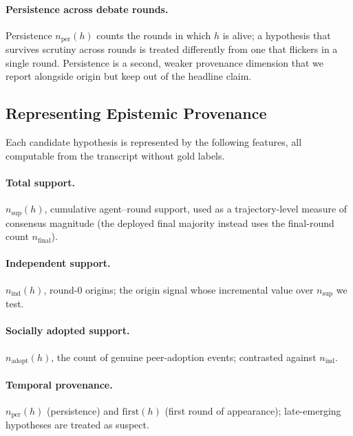 \paragraph{Persistence across debate rounds.}
\label{par:persistence}
Persistence $n_{\mathrm{per}}(h)$ counts the rounds in which $h$ is alive; a hypothesis that survives
scrutiny across rounds is treated differently from one that flickers in a single round. Persistence is a
second, weaker provenance dimension that we report alongside origin but keep out of the headline claim.

\subsection{Representing Epistemic Provenance}
\label{subsec:provenance_representation}

Each candidate hypothesis is represented by the following features, all computable from the transcript
without gold labels.

\paragraph{Total support.}
\label{par:total_support}
$n_{\mathrm{sup}}(h)$, cumulative agent--round support, used as a trajectory-level measure of consensus
magnitude (the deployed final majority instead uses the final-round count $n_{\mathrm{final}}$).

\paragraph{Independent support.}
\label{par:independent_support}
$n_{\mathrm{ind}}(h)$, round-$0$ origins; the origin signal whose incremental value over $n_{\mathrm{sup}}$
we test.

\paragraph{Socially adopted support.}
\label{par:inherited_support_feature}
$n_{\mathrm{adopt}}(h)$, the count of genuine peer-adoption events; contrasted against $n_{\mathrm{ind}}$.

\paragraph{Temporal provenance.}
\label{par:temporal_provenance}
$n_{\mathrm{per}}(h)$ (persistence) and $\mathrm{first}(h)$ (first round of appearance); late-emerging
hypotheses are treated as suspect.


